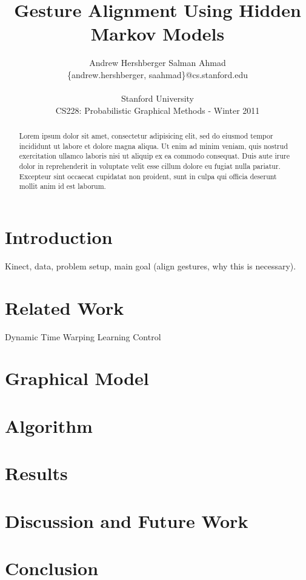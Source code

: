 \documentclass{article}
\title{Gesture Alignment Using Hidden Markov Models}
\author{
Andrew Hershberger
\quad Salman Ahmad \\
\{andrew.hershberger, saahmad\}@cs.stanford.edu
\\\\
Stanford University\\
CS228: Probabilistic Graphical Methods - Winter 2011\\
}
\begin{document}
\maketitle

\begin{abstract}


Lorem ipsum dolor sit amet, consectetur adipisicing elit, sed do eiusmod
tempor incididunt ut labore et dolore magna aliqua. Ut enim ad minim veniam,
quis nostrud exercitation ullamco laboris nisi ut aliquip ex ea commodo
consequat. Duis aute irure dolor in reprehenderit in voluptate velit esse
cillum dolore eu fugiat nulla pariatur. Excepteur sint occaecat cupidatat non
proident, sunt in culpa qui officia deserunt mollit anim id est laborum.

\end{abstract}

\section{Introduction}
Kinect, data, problem setup, main goal (align gestures, why this is necessary).

\section{Related Work}

Dynamic Time Warping \cite{Listgarten2005}
Learning Control \cite{Coates2008}

\section{Graphical Model}

\section{Algorithm}

\section{Results}

\section{Discussion and Future Work}

\section{Conclusion}





\end{document}
